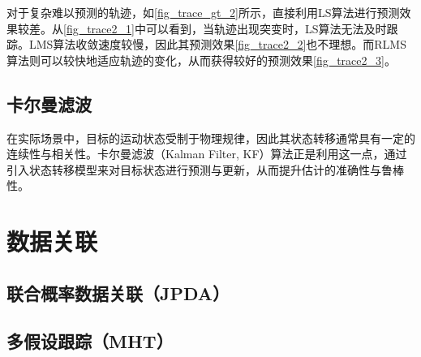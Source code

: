 \begin{solution}
    对于复杂难以预测的轨迹，如\cref{fig_trace_gt_2}所示，直接利用LS算法进行预测效果较差。从\cref{fig_trace2_1}中可以看到，当轨迹出现突变时，LS算法无法及时跟踪。LMS算法收敛速度较慢，因此其预测效果\cref{fig_trace2_2}也不理想。而RLMS算法则可以较快地适应轨迹的变化，从而获得较好的预测效果\cref{fig_trace2_3}。
\end{solution}

\subsection{卡尔曼滤波}
在实际场景中，目标的运动状态受制于物理规律，因此其状态转移通常具有一定的连续性与相关性。卡尔曼滤波（Kalman Filter, KF）算法正是利用这一点，通过引入状态转移模型来对目标状态进行预测与更新，从而提升估计的准确性与鲁棒性。

\section{数据关联}
\subsection{联合概率数据关联（JPDA）}
\subsection{多假设跟踪（MHT）}
